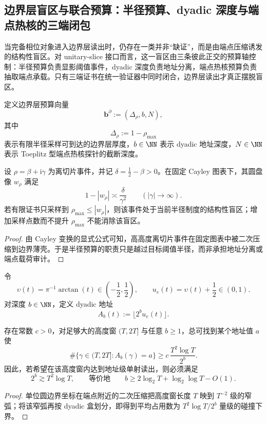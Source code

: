 \subsection{边界层盲区与联合预算：半径预算、dyadic 深度与端点热核的三端闭包}\label{subsec:unit-circle-boundary-joint-budget}
当完备相位对象进入边界层读出时，仍存在一类并非“缺证”，而是由端点压缩诱发的结构性盲区。对 unitary-slice 接口而言，这一盲区由三条彼此正交的预算轴控制：半径预算负责显影阈值事件，dyadic 深度负责地址分离，端点热核预算负责抽取端点承载。只有三端证书在统一验证器中同时闭合，边界层读出才真正摆脱盲区。

\begin{definition}[边界层预算向量]\label{def:unit-circle-boundary-budget-vector}
定义边界层预算向量
\[
\mathbf b^\partial:=(\Delta_\rho,b,N),
\]
其中
\[
\Delta_\rho:=1-\rho_{\max}
\]
表示有限半径采样可到达的边界层厚度，\(b\in\NN\) 表示 dyadic 地址深度，\(N\in\NN\) 表示 Toeplitz 型端点热核探针的截断深度。
\end{definition}

\begin{proposition}[半径预算的结构性任务]\label{prop:unit-circle-boundary-radial-blindspot}
设 \(\rho=\beta+\mathrm{i}\gamma\) 为离切片事件，并记 \(\delta=\frac12-\beta>0\)。在固定 Cayley 图表下，其圆盘像 \(w_\rho\) 满足
\[
1-|w_\rho|
\asymp
\frac{\delta}{\gamma^2}
\qquad (|\gamma|\to\infty).
\]
若有限证书只采样到 \(\rho_{\max}\le |w_\rho|\)，则该事件处于当前半径制度的结构性盲区；增加采样点数而不提升 \(\rho_{\max}\) 不能消除该盲区。
\end{proposition}
\begin{proof}
由 Cayley 变换的显式公式可知，高高度离切片事件在固定图表中被二次压缩到边界薄壳。于是半径预算的职责只是越过目标阈值半径，而非承担地址分离或端点载荷审计。
\end{proof}

\begin{definition}[dyadic 地址]\label{def:unit-circle-boundary-dyadic-address}
令
\[
\upsilon(t)=\pi^{-1}\arctan(t)\in\left(-\frac12,\frac12\right),
\qquad
u_e(t)=\upsilon(t)+\frac12\in(0,1).
\]
对深度 \(b\in\NN\)，定义 dyadic 地址
\[
A_b(t):=\lfloor 2^b u_e(t)\rfloor.
\]
\end{definition}

\begin{proposition}[地址碰撞强制律]\label{prop:unit-circle-boundary-dyadic-collision}
存在常数 \(c>0\)，对足够大的高度窗 \((T,2T]\) 与任意 \(b\ge 1\)，总可找到某个地址值 \(a\) 使
\[
\#\{\gamma\in(T,2T]:A_b(\gamma)=a\}
\ge
c\,\frac{T^2\log T}{2^b}.
\]
因此，若希望在该高度窗内达到地址级单射读出，则必须满足
\[
2^b\gtrsim T^2\log T,
\qquad\text{等价地}\qquad
b\ge 2\log_2 T+\log_2\log T-O(1).
\]
\end{proposition}
\begin{proof}
单位圆边界坐标在端点附近的二次压缩把高度窗长度 \(T\) 映到 \(T^{-2}\) 级的窄弧；将该窄弧再按 dyadic 盒划分，即得到平均占用数为 \(T^2\log T/2^b\) 量级的碰撞下界。
\end{proof}

